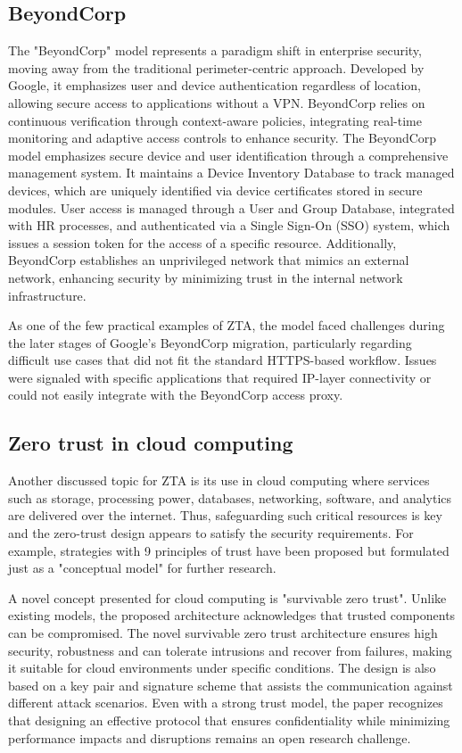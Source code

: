 \subsection{BeyondCorp}
The "BeyondCorp"\cite{ward2014beyondcorp} model represents a paradigm shift in enterprise security, moving away from the traditional perimeter-centric approach. Developed by Google, it emphasizes user and device authentication regardless of location, allowing secure access to applications without a VPN. BeyondCorp relies on continuous verification through context-aware policies, integrating real-time monitoring and adaptive access controls to enhance security. The BeyondCorp model emphasizes secure device and user identification through a comprehensive management system. It maintains a Device Inventory Database to track managed devices, which are uniquely identified via device certificates stored in secure modules. User access is managed through a User and Group Database, integrated with HR processes, and authenticated via a Single Sign-On (SSO) system, which issues a session token for the access of a specific resource. Additionally, BeyondCorp establishes an unprivileged network that mimics an external network, enhancing security by minimizing trust in the internal network infrastructure.

As one of the few practical examples of ZTA, the model faced challenges during the later stages of Google's BeyondCorp migration, particularly regarding difficult use cases that did not fit the standard HTTPS-based workflow. Issues were signaled with specific applications that required IP-layer connectivity or could not easily integrate with the BeyondCorp access proxy\cite{gonccalves2023beyondcorp}.

\subsection{Zero trust in cloud computing}

Another discussed topic for ZTA is its use in cloud computing where services such as storage, processing power, databases, networking, software, and analytics are delivered over the internet. Thus, safeguarding such critical resources is key and the zero-trust design appears to satisfy the security requirements. For example, strategies with 9 principles of trust have been proposed but formulated just as a "conceptual model"\cite{9104214} for further research.

A novel concept presented for cloud computing is "survivable zero trust". Unlike existing models, the proposed architecture \cite{ferretti2021survivable} acknowledges that trusted components can be compromised. The novel survivable zero trust architecture ensures high security, robustness and can tolerate intrusions and recover from failures, making it suitable for cloud environments under specific conditions. The design is also based on a key pair and signature scheme that assists the communication against different attack scenarios. Even with a strong trust model, the paper recognizes that designing an effective protocol that ensures confidentiality while minimizing performance impacts and disruptions remains an open research challenge.

